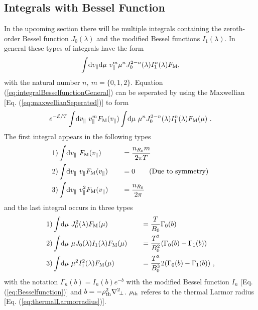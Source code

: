 \subsection*{Integrals with Bessel Function}
\label{sub:integralBesselfunction}

In the upcoming section there will be multiple integrals containing the zeroth-order Bessel function $J_0(\lambda)$ and the modified Bessel functions $I_1(\lambda)$. In general these types of integrals have the form
\begin{gather}
	\int \! \mathrm{d}v_\parallel\mathrm{d}\mu~ v_\parallel^m \mu^n J_0^{2-n}(\lambda) I_1^n(\lambda) F_\mathrm{M} ,
	\label{eq:integralBesselfunctionGeneral}
\end{gather}
with the natural number $n,~m = \{0, 1, 2\}$. Equation (\ref{eq:integralBesselfunctionGeneral}) can be seperated by using the Maxwellian [Eq. (\ref{eq:maxwellianSeperated})] to form
\begin{gather}
	e^{-\mathcal{E}/T} \int \! \mathrm{d}v_\parallel ~ v_\parallel^m F_\mathrm{M}(v_\parallel) \int \! \mathrm{d}\mu ~ \mu^n J_0^{2-n}(\lambda) I_1^n(\lambda) F_\mathrm{M}(\mu) ~.
	\label{eq:integralBesselfunctionGeneralSperated}
\end{gather}
The first integral appears in the following types
\begin{gather}
	\begin{aligned}
		1)& \int \! \mathrm{d}v_\parallel ~         F_\mathrm{M}(v_\parallel) &\quad &= \frac{n_{R_0} m}{2\pi T} \\
		2)& \int \! \mathrm{d}v_\parallel ~ v_\parallel   F_\mathrm{M}(v_\parallel) &\quad &= 0 \qquad \mathrm{(Due~to~symmetry)}\\
		3)& \int \! \mathrm{d}v_\parallel ~ v_\parallel^2 F_\mathrm{M}(v_\parallel) &\quad &= \frac{n_{R_0}}{2\pi} \\
	\end{aligned}
	\label{eq:integralMaxwellian}
\end{gather}
and the last integral occurs in three types
\begin{gather}
	\begin{aligned}
		1)& \int \! \mathrm{d}\mu ~ J_0^2(\lambda) F_\mathrm{M}(\mu) &\quad &= \frac{T}{B_0} \Gamma_0(b) \\
		2)& \int \! \mathrm{d}\mu ~ \mu J_0(\lambda) I_1(\lambda) F_\mathrm{M}(\mu) &\quad &= \frac{T^2}{B_0^2} (\Gamma_0(b) - \Gamma_1(b)) \\
		3)& \int \! \mathrm{d}\mu ~ \mu^2 I_1^2(\lambda) F_\mathrm{M}(\mu) &\quad &= \frac{T^3}{B_0^3} 2 (\Gamma_0(b) - \Gamma_1(b))~, \\
	\end{aligned}
	\label{eq:integralBesselfunction}
\end{gather}
with the notation $\Gamma_n(b) = I_n(b) e^{-b}$ with the modified Bessel function $I_n$ [Eq. (\ref{eq:Besselfunction})] and $b= - \rho_{\mathrm{th}}^2 \nabla^2\!_\perp$. $\rho_{\mathrm{th}}$ referes to the thermal Larmor radius [Eq. (\ref{eq:thermalLarmorradius})]. \cite{GKWDerivation}
\newpage